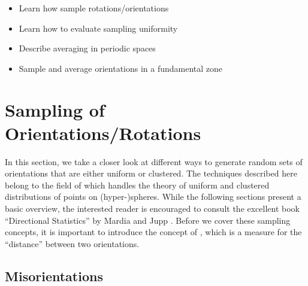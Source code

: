 \begin{learningobjectives}
{\begin{itemize}
    \item[{\color{OCBurntOrange}\ref{\chabbr:sec:sampling}:}] Learn how sample rotations/orientations
    \item[{\color{OCBurntOrange}\ref{\chabbr:sec:Riesz}:}] Learn how to evaluate sampling uniformity
    \item[{\color{OCBurntOrange}\ref{\chabbr:sec:orientationaveraging}:}] Describe averaging in periodic spaces 
    \item[{\color{OCBurntOrange}\ref{\chabbr:sec:samplingRFZs}:}] Sample and average orientations in a fundamental zone 
\end{itemize}}
\end{learningobjectives}



\section{Sampling of Orientations/Rotations}\label{\chabbr:sec:sampling}

In this section, we take a closer look at different ways to generate random sets of orientations that are either uniform or clustered. The techniques described here belong to the field of  which handles the theory of uniform and clustered distributions of points on (hyper-)spheres.  While the following sections present a basic overview, the interested reader is encouraged to consult the excellent book ``Directional Statistics'' by Mardia and Jupp \cite{mardia2009a}. Before we cover these sampling concepts, it is important to introduce the concept of , which is a measure for the ``distance'' between two orientations.

\subsection{Misorientations}\label{\chabbr:ssec:misorientations}


